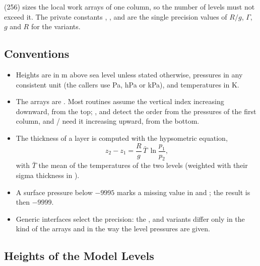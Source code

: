  (256) sizes the local work arrays of one column, so the
number of levels must not exceed it. The private constants ,
,  and  are the single precision
values of $R/g$, $\Gamma$, $g$ and $R$ for the  variants.

\subsection{Conventions}

\begin{itemize}
  \item Heights are in m above sea level unless stated otherwise, pressures
        in any consistent unit (the callers use Pa, hPa or kPa), and
        temperatures in K.
  \item The arrays are . Most routines assume the vertical
        index increasing downward, from the top; ,
         and  detect the order from the
        pressures of the first column, and / need it
        increasing upward, from the bottom.
  \item The thickness of a layer is computed with the hypsometric equation,
        \[
          z_2 - z_1 = \frac{R}{g}\,\bar T\,\ln\frac{p_1}{p_2},
        \]
        with $\bar T$ the mean of the temperatures of the two levels
        (weighted with their sigma thickness in ).
  \item A surface pressure below $-9995$ marks a missing value in
         and ; the result is then $-9999$.
  \item Generic interfaces select the precision: the ,
         and  variants differ only in the kind
        of the arrays and in the way the level pressures are given.
\end{itemize}

\subsection{Heights of the Model Levels}
\label{subsec:hgt_levels}

